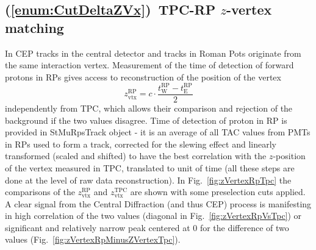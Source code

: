\subsection{(\ref{enum:CutDeltaZVx})~TPC-RP \texorpdfstring{$z$}{z}-vertex matching}\label{sec:C5}

In CEP tracks in the central detector and tracks in Roman Pots originate from the same interaction vertex. Measurement of the time of detection of forward protons in RPs gives access to reconstruction of the position of the vertex
\begin{equation}
z_{\text{vtx}}^{\text{RP}} = c\cdot\frac{t^{\text{RP}}_{\text{W}} - t^{\text{RP}}_{\text{E}}}{2}
\end{equation}
independently from TPC, which allows their comparison and rejection of the background if the two values disagree. Time of detection of proton in RP is provided in StMuRpsTrack object - it is an average of all TAC values from PMTs in RPs used to form a track, corrected for the slewing effect and linearly transformed (scaled and shifted) to have the best correlation with the $z$-position of the vertex measured in TPC, translated to unit of time (all these steps are done at the level of raw data reconstruction). In Fig.~\ref{fig:zVertexRpTpc} the comparisons of the $z_{\text{vtx}}^{\text{RP}}$ and $z_{\text{vtx}}^{\text{TPC}}$ are shown with some preselection cuts applied. A clear signal from the Central Diffraction (and thus CEP) process is manifesting in high correlation of the two values (diagonal in Fig.~\ref{fig:zVertexRpVsTpc}) or significant and relatively narrow peak centered at 0 for the difference of two values (Fig.~\ref{fig:zVertexRpMinusZVertexTpc}). %
